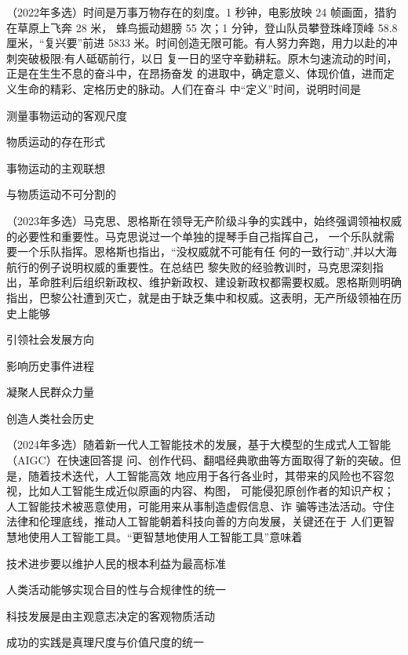 \documentclass[lang=cn,blue,10pt,scheme=chinese,twocol]{zznote}
\begin{document}
\begin{example}	（2022年多选）时间是万事万物存在的刻度。1 秒钟，电影放映 24 帧画面，猎豹在草原上飞奔 28 米，
	蜂鸟振动翅膀 55 次；1 分钟，登山队员攀登珠峰顶峰 58.8 厘米，“复兴要”前进 5833
	米。时间创造无限可能。有人努力奔跑，用力以赴的冲刺突破极限:有人砥砺前行，以日
	复一日的坚守辛勤耕耘。原木匀速流动的时间，正是在生生不息的奋斗中，在昂扬奋发
	的进取中，确定意义、体现价值，进而定义生命的精彩、定格历史的脉动。人们在奋斗
	中“定义”时间，说明时间是

	\begin{choice}
		\item 测量事物运动的客观尺度
		\item 物质运动的存在形式
		\item 事物运动的主观联想
		\item 与物质运动不可分割的
	\end{choice}
\end{example}

\begin{example} （2023年多选）马克思、恩格斯在领导无产阶级斗争的实践中，始终强调领袖权威
	的必要性和重要性。马克思说过一个单独的提琴手自己指挥自己， 一个乐队就需要一个乐队指挥。恩格斯也指出，“没权威就不可能有任 何的一致行动”,并以大海航行的例子说明权威的重要性。在总结巴
	黎失败的经验教训时，马克思深刻指出，革命胜利后组织新政权、维护新政权、建设新政权都需要权威。恩格斯则明确指出，巴黎公社遭到灭亡，就是由于缺乏集中和权威。这表明，无产所级领袖在历史上能够
	\begin{choice}
		\item 引领社会发展方向
		\item 影响历史事件进程
		\item 凝聚人民群众力量
		\item 创造人类社会历史
	\end{choice}
\end{example}


\begin{example} （2024年多选）随着新一代人工智能技术的发展，基于大模型的生成式人工智能（AIGC）在快速回答提 问、创作代码、翻唱经典歌曲等方面取得了新的突破。但是，随着技术迭代，人工智能高效 地应用于各行各业时，其带来的风险也不容忽视，比如人工智能生成近似原画的内容、构图， 可能侵犯原创作者的知识产权；人工智能技术被恶意使用，可能用来从事制造虚假信息、诈 骗等违法活动。守住法律和伦理底线，推动人工智能朝着科技向善的方向发展，关键还在于 人们更智慧地使用人工智能工具。“更智慧地使用人工智能工具”意味着
	\begin{choice}
		\item 技术进步要以维护人民的根本利益为最高标准
		\item 人类活动能够实现合目的性与合规律性的统一
		\item 科技发展是由主观意志决定的客观物质活动
		\item 成功的实践是真理尺度与价值尺度的统一
	\end{choice}
\end{example}
\end{document}
